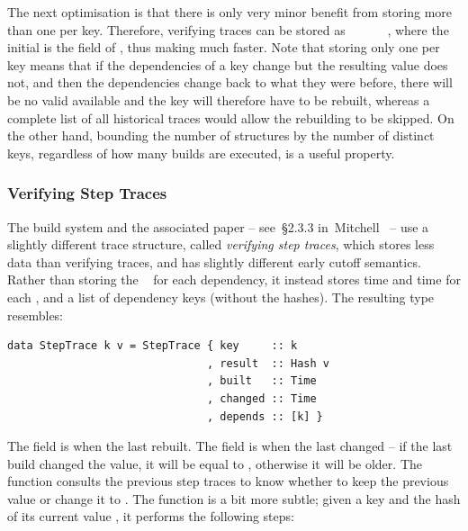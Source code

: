 The next optimisation is that there is only very minor benefit from storing more
than one  per key. Therefore, verifying traces can be stored as
~~~~~~, where the
initial  is the  field of , thus making 
much faster. Note that storing only one  per key means that if the
dependencies of a key change but the resulting value does not, and then the
dependencies change back to what they were before, there will be no valid
 available and the key will therefore have to be rebuilt, whereas a
complete list of all historical traces would allow the rebuilding to be skipped.
On the other hand, bounding the number of  structures by the number of
distinct keys, regardless of how many builds are executed, is a useful property.

\subsubsection{Verifying Step Traces}\label{sec-step-traces}

The \Shake build system and the associated paper -- see~\S2.3.3
in~Mitchell~ -- use a slightly different trace
structure, called \emph{verifying step traces},
which stores less data than verifying traces, and has slightly different early cutoff semantics. Rather than
storing the ~ for each dependency, it instead stores 
time and  time for each , and a list of dependency keys
(without the hashes). The resulting  type resembles:

\vspace{1mm}
\begin{verbatim}
data StepTrace k v = StepTrace { key     :: k
                               , result  :: Hash v
                               , built   :: Time
                               , changed :: Time
                               , depends :: [k] }
\end{verbatim}
\vspace{1mm}

\noindent
The  field is when the  last rebuilt. The  field
is when the  last changed -- if the last build changed the value, it
will be equal to , otherwise it will be older. The function
 consults the previous step traces to know whether to keep the
previous  value or change it to . The function
 is a bit more subtle; given a key  and the hash of its
current value , it performs the following steps:

